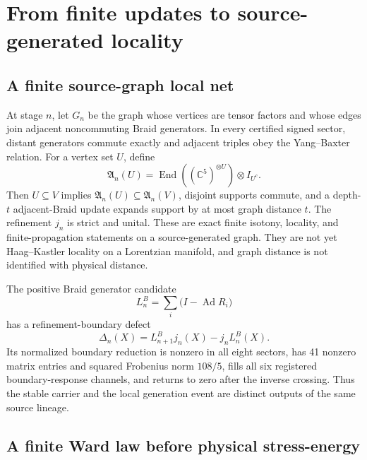 \documentclass[11pt]{article}
\theoremstyle{definition}
\theoremstyle{remark}
\newcommand{\Ad}{\operatorname{Ad}}
\begin{document}
\section{From finite updates to source-generated locality}

\subsection{A finite source-graph local net}

At stage $n$, let $G_n$ be the graph whose vertices are tensor factors and whose edges join adjacent noncommuting Braid generators. In every certified signed sector, distant generators commute exactly and adjacent triples obey the Yang--Baxter relation. For a vertex set $U$, define
\begin{equation}\label{eq:localnet}
 \mathfrak A_n(U)=\operatorname{End}\!\left((\mathbb C^5)^{\otimes U}\right)\otimes I_{U^c}.
\end{equation}
Then $U\subseteq V$ implies $\mathfrak A_n(U)\subseteq\mathfrak A_n(V)$, disjoint supports commute, and a depth-$t$ adjacent-Braid update expands support by at most graph distance $t$. The refinement $j_n$ is strict and unital. These are exact finite isotony, locality, and finite-propagation statements on a source-generated graph. They are not yet Haag--Kastler locality on a Lorentzian manifold, and graph distance is not identified with physical distance.

The positive Braid generator candidate
\begin{equation}\label{eq:braidgenerator}
 L_n^B=\sum_i\bigl(I-\Ad R_i\bigr)
\end{equation}
has a refinement-boundary defect
\begin{equation}\label{eq:boundarydefect}
 \Delta_n(X)=L_{n+1}^Bj_n(X)-j_nL_n^B(X).
\end{equation}
Its normalized boundary reduction is nonzero in all eight sectors, has 41 nonzero matrix entries and squared Frobenius norm $108/5$, fills all six registered boundary-response channels, and returns to zero after the inverse crossing. Thus the stable carrier and the local generation event are distinct outputs of the same source lineage.

\subsection{A finite Ward law before physical stress-energy}
\end{document}
